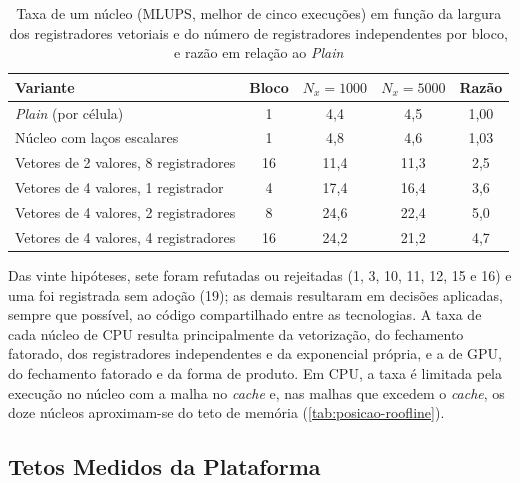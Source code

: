 \begin{table}[H]
    \centering
    \caption{Taxa de um núcleo (MLUPS, melhor de cinco execuções) em função da largura dos registradores vetoriais e do número de registradores independentes por bloco, e razão em relação ao \textit{Plain}}
    \label{tab:ablacao-nucleo}
    \begin{tabular}{>{\raggedright\arraybackslash}p{6.6cm}cccc}
        \toprule
        Variante & Bloco & \(N_x = 1000\) & \(N_x = 5000\) & Razão \\
        \midrule
        \textit{Plain} (por célula) & 1 & 4{,}4 & 4{,}5 & 1{,}00 \\
        Núcleo com laços escalares & 1 & 4{,}8 & 4{,}6 & 1{,}03 \\
        Vetores de 2 valores, 8 registradores & 16 & 11{,}4 & 11{,}3 & 2{,}5 \\
        Vetores de 4 valores, 1 registrador & 4 & 17{,}4 & 16{,}4 & 3{,}6 \\
        Vetores de 4 valores, 2 registradores & 8 & 24{,}6 & 22{,}4 & 5{,}0 \\
        Vetores de 4 valores, 4 registradores & 16 & 24{,}2 & 21{,}2 & 4{,}7 \\
        \bottomrule
    \end{tabular}
\end{table}

Das vinte hipóteses, sete foram refutadas ou rejeitadas (1, 3, 10, 11, 12, 15 e 16) e uma foi registrada sem adoção (19); as demais resultaram em decisões aplicadas, sempre que possível, ao código compartilhado entre as tecnologias.
A taxa de cada núcleo de CPU resulta principalmente da vetorização, do fechamento fatorado, dos registradores independentes e da exponencial própria, e a de GPU, do fechamento fatorado e da forma de produto.
Em CPU, a taxa é limitada pela execução no núcleo com a malha no \textit{cache} e, nas malhas que excedem o \textit{cache}, os doze núcleos aproximam-se do teto de memória (\autoref{tab:posicao-roofline}).

\subsection{Tetos Medidos da Plataforma}\label{subsec:tetos-medidos}

